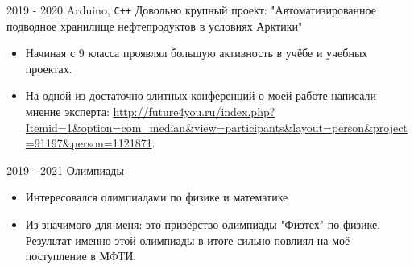 \experience
{2019 - 2020}
{Arduino, \texttt{C++}}
{Довольно крупный проект: "Автоматизированное подводное хранилище нефтепродуктов в условиях Арктики"}
{\begin{itemize}
    \item Начиная с 9 класса проявлял большую активность в учёбе и учебных проектах.
    \item На одной из достаточно элитных конференций о моей работе написали мнение эксперта: \url{http://future4you.ru/index.php?Itemid=1&option=com_median&view=participants&layout=person&project=91197&person=1121871}.
\end{itemize}}

\experience
{2019 - 2021}
{}
{Олимпиады}
{\begin{itemize}
    \item Интересовался олимпиадами по физике и математике
    \item Из значимого для меня: это призёрство олимпиады "Физтех" по физике. Результат именно этой олимпиады в итоге сильно повлиял на моё поступление в МФТИ.
\end{itemize}}